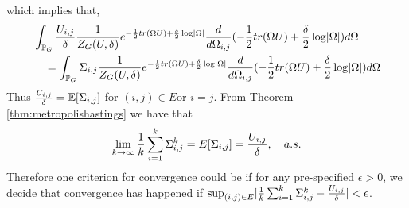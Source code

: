 \documentclass[12pt, leqno]{article}
\providecommand{\abs}[1]{\lvert#1\rvert}
\def\s{\ensuremath\Sigma}
\def\om{\ensuremath\Omega}
\def\pg{\ensuremath\mathbb{P}_{{G}}}
\def\E{\ensuremath\mathbb{E}}
\begin{document}
which implies that,
\begin{align*}
&\int_{\pg} \frac{U_{i,j}}{\delta} \frac{1}{Z_G(U,\delta)} e^{-\frac{1}{2}tr(\om U) + \frac{\delta}{2}
  \log \abs{\om}} \frac{d}{d \om_{i,j}}(-\frac{1}{2}tr(\om U) + \frac{\delta}{2}
  \log \abs{\om}) d \om \\ & \quad = \int_{\pg} \s_{i,j}\frac{1}{Z_G(U,\delta)} e^{-\frac{1}{2}tr(\om U) + \frac{\delta}{2}
  \log \abs{\om}} \frac{d}{d \om_{i,j}}(-\frac{1}{2}tr(\om U) + \frac{\delta}{2}
  \log \abs{\om}) d \om
\end{align*}
Thus $\frac{U_{i,j}}{\delta}  = \E[\s_{i,j}]$ for $(i,j) \in E \text{
  or } i = j$. From Theorem \ref{thm:metropolishastings} we have that
\begin{align*}\lim_{k \to \infty} \frac{1}{k} \sum_{i=1}^k \s_{i,j}^k =
  E[\s_{i,j}] = \frac{U_{i,j}}{\delta}, \quad a.s.
\end{align*}
Therefore one criterion for convergence could be if for any
pre-specified  $\epsilon>0$, we decide that convergence has happened
if $\sup_{(i,j) \in E} \abs{\frac{1}{k}
  \sum_{i=1}^k \s_{i,j}^k - \frac{U_{i,j}}{\delta}} < \epsilon$.
\end{document}
